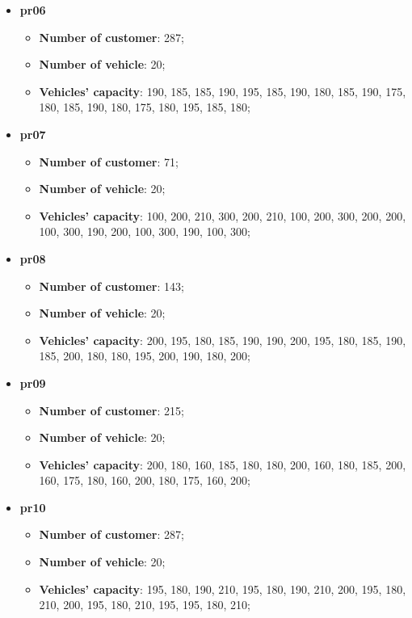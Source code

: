 \documentclass[main.tex]{subfiles}
\begin{document}
\begin{itemize}
    \item \textbf{pr06}
        \begin{itemize}
            \item \textbf{Number of customer}: 287;
            \item \textbf{Number of vehicle}: 20;
            \item \textbf{Vehicles' capacity}: 190, 185, 185, 190, 195, 185, 190, 180, 185, 190, 175, 180, 185, 190, 180, 175, 180, 195, 185, 180;
        \end{itemize}

    \item \textbf{pr07}
        \begin{itemize}
            \item \textbf{Number of customer}: 71;
            \item \textbf{Number of vehicle}: 20;
            \item \textbf{Vehicles' capacity}: 100, 200, 210, 300, 200, 210, 100, 200, 300, 200, 200, 100, 300, 190, 200, 100, 300, 190, 100, 300;
        \end{itemize}

    \item \textbf{pr08}
        \begin{itemize}
            \item \textbf{Number of customer}: 143;
            \item \textbf{Number of vehicle}: 20;
            \item \textbf{Vehicles' capacity}: 200, 195, 180, 185, 190, 190, 200, 195, 180, 185, 190, 185, 200, 180, 180, 195, 200, 190, 180, 200;
        \end{itemize}

    \item \textbf{pr09}
        \begin{itemize}
            \item \textbf{Number of customer}: 215;
            \item \textbf{Number of vehicle}: 20;
            \item \textbf{Vehicles' capacity}: 200, 180, 160, 185, 180, 180, 200, 160, 180, 185, 200, 160, 175, 180, 160, 200, 180, 175, 160, 200;
        \end{itemize}

    \item \textbf{pr10}
        \begin{itemize}
            \item \textbf{Number of customer}: 287;
            \item \textbf{Number of vehicle}: 20;
            \item \textbf{Vehicles' capacity}: 195, 180, 190, 210, 195, 180, 190, 210, 200, 195, 180, 210, 200, 195, 180, 210, 195, 195, 180, 210;
        \end{itemize}


\end{itemize}
\end{document}
